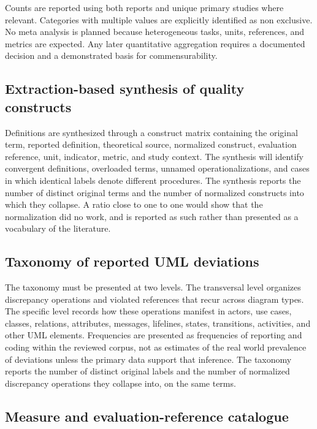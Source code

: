 Counts are reported using both reports and unique primary studies where relevant. Categories with multiple values are explicitly identified as non exclusive. No meta analysis is planned because heterogeneous tasks, units, references, and metrics are expected. Any later quantitative aggregation requires a documented decision and a demonstrated basis for commensurability.

\subsection{Extraction-based synthesis of quality constructs}

Definitions are synthesized through a construct matrix containing the original term, reported definition, theoretical source, normalized construct, evaluation reference, unit, indicator, metric, and study context. The synthesis will identify convergent definitions, overloaded terms, unnamed operationalizations, and cases in which identical labels denote different procedures. The synthesis reports the number of distinct original terms and the number of normalized constructs into which they collapse. A ratio close to one to one would show that the normalization did no work, and is reported as such rather than presented as a vocabulary of the literature.

\subsection{Taxonomy of reported UML deviations}

The taxonomy must be presented at two levels. The transversal level organizes discrepancy operations and violated references that recur across diagram types. The specific level records how these operations manifest in actors, use cases, classes, relations, attributes, messages, lifelines, states, transitions, activities, and other UML elements. Frequencies are presented as frequencies of reporting and coding within the reviewed corpus, not as estimates of the real world prevalence of deviations unless the primary data support that inference. The taxonomy reports the number of distinct original labels and the number of normalized discrepancy operations they collapse into, on the same terms.

\subsection{Measure and evaluation-reference catalogue}

